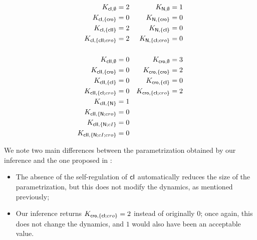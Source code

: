 \begin{table}[t]
\begin{align*}
  K_{\mathsf{cI}, \emptyset} &= 2 &
  K_{\mathsf{N}, \emptyset} &= 1\\
  K_{\mathsf{cI}, \{\mathsf{cro}\}} &= 0&
  K_{\mathsf{N}, \{\mathsf{cro}\}} &= 0\\
  K_{\mathsf{cI}, \{\mathsf{cII}\}} &= 2&
  K_{\mathsf{N}, \{\mathsf{cI}\}} &= 0\\
  K_{\mathsf{cI}, \{\mathsf{cII};cro\}} &= 2&
  K_{\mathsf{N}, \{\mathsf{cI};cro\}} &= 0\\
  \\
  K_{\mathsf{cII}, \emptyset} &= 0&
  K_{\mathsf{cro}, \emptyset} &= 3\\
  K_{\mathsf{cII}, \{\mathsf{cro}\}} &= 0&
  K_{\mathsf{cro}, \{\mathsf{cro}\}} &= 2\\
  K_{\mathsf{cII}, \{\mathsf{cI}\}} &= 0&
  K_{\mathsf{cro}, \{\mathsf{cI}\}} &= 0\\
  K_{\mathsf{cII}, \{\mathsf{cI};cro\}} &= 0&
  K_{\mathsf{cro}, \{\mathsf{cI};cro\}} &= 2\\
  K_{\mathsf{cII}, \{\mathsf{N}\}} &= 1\\
  K_{\mathsf{cII}, \{\mathsf{N};cro\}} &= 0\\
  K_{\mathsf{cII}, \{\mathsf{N};cI\}} &= 0\\
  K_{\mathsf{cII}, \{\mathsf{N};cI;cro\}} &= 0
\end{align*}
\caption{\label{tb:phage-lambda-k}%
  Result of the parameters inference performed on the Process Hitting model
  of the phage lambda immunity response
  taken from \cite{thieffry_dynamical_1995}.
}
\end{table}

We note two main differences between the parametrization obtained by our inference
and the one proposed in \cite{thieffry_dynamical_1995}:
\begin{itemize}
  \item The absence of the self-regulation of $\mathsf{cI}$ automatically reduces the size
    of the parametrization, but this does not modify the dynamics, as mentioned previously;
  \item Our inference returns $K_{\mathsf{cro}, \{\mathsf{cI};cro\}} = 2$ instead of originally $0$;
    once again, this does not change the dynamics, and $1$ would also have been
    an acceptable value.
\end{itemize}
